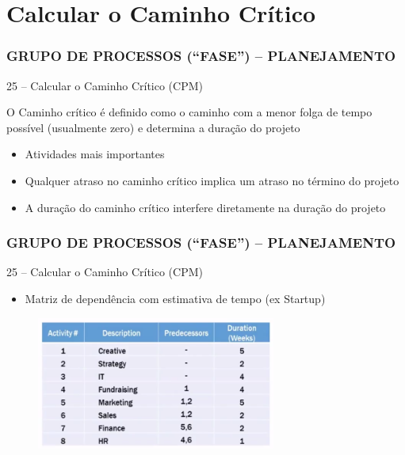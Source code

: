 \section{Calcular o Caminho Crítico}
\begin{frame}
 \frametitle{GRUPO DE PROCESSOS (“FASE”) – PLANEJAMENTO}
25 – Calcular o Caminho Crítico (CPM)
\begin{block}{}
 O Caminho crítico é definido como o caminho com a menor folga de tempo possível (usualmente zero) e determina a duração do projeto
\end{block}
  \begin{itemize}
   \item Atividades mais importantes
   \item Qualquer atraso no caminho crítico implica um atraso no término do projeto
   \item A duração do caminho crítico interfere diretamente na duração do projeto
  \end{itemize}
\end{frame}

\begin{frame}
 \frametitle{GRUPO DE PROCESSOS (“FASE”) – PLANEJAMENTO}
25 – Calcular o Caminho Crítico (CPM)
 \begin{itemize}
  \item Matriz de dependência com estimativa de tempo (ex Startup)
 \end{itemize}
  \begin{figure}
   \centering
   \includegraphics[width = 0.7\textwidth]{figs/fig24.png}
  \end{figure}
\end{frame}

